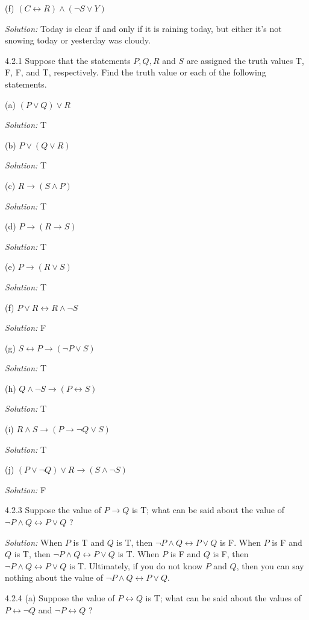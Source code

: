 \documentclass{letter}
\newcommand{\tmem}[1]{{\em #1\/}}
\begin{document}
(f) $(C \leftrightarrow R) \wedge (\neg S \vee Y)$

{\tmem{Solution:}} Today is clear if and only if it is raining today, but
either it's not snowing today or yesterday was cloudy.

4.2.1 Suppose that the statements $P, Q, R$ and $S$ are assigned the truth
values T, F, F, and T, respectively. Find the truth value or each of the
following statements.

(a) $(P \vee Q) \vee R$

{\tmem{Solution:}} T

(b) $P \vee (Q \vee R)$

{\tmem{Solution:}} T

(c) $R \rightarrow (S \wedge P)$

{\tmem{Solution:}} T

(d) $P \rightarrow (R \rightarrow S)$

{\tmem{Solution:}} T

(e) $P \rightarrow (R \vee S)$

{\tmem{Solution:}} T

(f) $P \vee R \leftrightarrow R \wedge \neg S$

{\tmem{Solution:}} F

(g) $S \leftrightarrow P \rightarrow (\neg P \vee S)$

{\tmem{Solution:}} T

(h) $Q \wedge \neg S \rightarrow (P \leftrightarrow S)$

{\tmem{Solution:}} T

(i) $R \wedge S \rightarrow (P \rightarrow \neg Q \vee S)$

{\tmem{Solution:}} T

(j) $(P \vee \neg Q) \vee R \rightarrow (S \wedge \neg S)$

{\tmem{Solution:}} F

4.2.3 Suppose the value of $P \rightarrow Q$ is T; what can be said about the
value of $\neg P \wedge Q \leftrightarrow P \vee Q$ ?

{\tmem{Solution:}} When $P$ is T and $Q$ is T, then $\neg P \wedge Q
\leftrightarrow P \vee Q$ is F. When $P$ is F and $Q$ is T, then $\neg P
\wedge Q \leftrightarrow P \vee Q$ is T. When $P$ is F and $Q$ is F, then
$\neg P \wedge Q \leftrightarrow P \vee Q$ is T. Ultimately, if you do not
know $P$ and $Q$, then you can say nothing about the value of $\neg P \wedge Q
\leftrightarrow P \vee Q$.

4.2.4 (a) Suppose the value of $P \leftrightarrow Q$ is T; what can be said
about the values of $P \leftrightarrow \neg Q$ and $\neg P \leftrightarrow Q$
?
\end{document}
